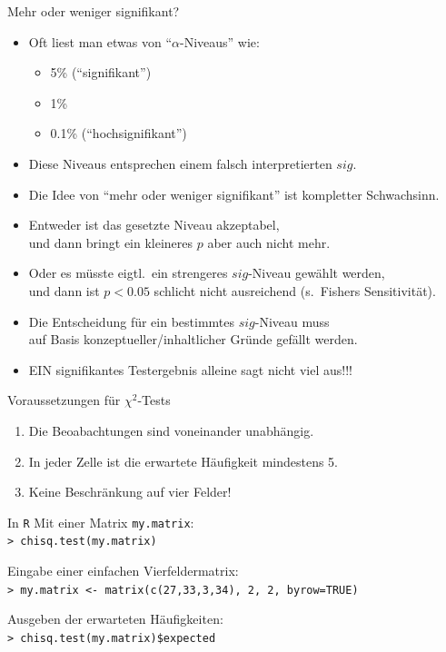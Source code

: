 \begin{frame}
  {Mehr oder weniger signifikant?}
  \begin{itemize}[<+->]
    \item Oft liest man etwas von "`$\alpha$-Niveaus"' wie:
      \begin{itemize}[<+->]
	\item 5\% ("`signifikant"')
	\item 1\%
	\item 0.1\% ("`hochsignifikant"')
      \end{itemize}
    \item Diese Niveaus entsprechen einem falsch interpretierten $sig$.
    \item Die Idee von "`mehr oder weniger signifikant"' ist \alert{kompletter Schwachsinn}.
    \item Entweder ist das gesetzte Niveau akzeptabel,\\
      und dann bringt ein kleineres $p$ aber auch nicht mehr.
    \item Oder es müsste eigtl.\ ein strengeres $sig$-Niveau gewählt werden,\\
      und dann ist $p<0.05$ schlicht nicht ausreichend (s.\ Fishers \alert{Sensitivität}).
    \item Die Entscheidung für ein bestimmtes $sig$-Niveau muss\\
      auf Basis konzeptueller\slash inhaltlicher Gründe gefällt werden.
    \item \alert{EIN signifikantes Testergebnis alleine sagt nicht viel aus!!!}
  \end{itemize}
\end{frame}




\begin{frame}{Voraussetzungen für $\chi^2$-Tests}
  \begin{enumerate}[<+->]
    \item Die Beoabachtungen sind voneinander unabhängig.
    \item In jeder Zelle ist die erwartete Häufigkeit mindestens 5.
    \item Keine Beschränkung auf vier Felder!
  \end{enumerate}
\end{frame}

\begin{frame}
  {In \texttt{R}}
  Mit einer Matrix \texttt{my.matrix}:\\
  \texttt{> chisq.test(my.matrix)}\\
  \vspace{0.5cm}
  
  Eingabe einer einfachen Vierfeldermatrix:\\
  \texttt{> my.matrix <- matrix(c(27,33,3,34), 2, 2, byrow=TRUE)}\\
  \vspace{0.5cm}
  
  Ausgeben der erwarteten Häufigkeiten:\\
  \texttt{> chisq.test(my.matrix)\$expected}\\

  \end{frame}

